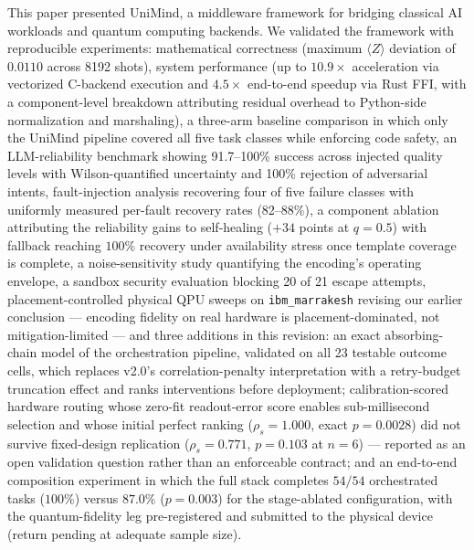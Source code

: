 ﻿\documentclass[12pt,a4paper]{article}
\begin{document}
This paper presented UniMind, a middleware framework for bridging classical AI workloads and quantum computing backends. We validated the framework with reproducible experiments: mathematical correctness (maximum $\langle Z \rangle$ deviation of $0.0110$ across 8192 shots), system performance (up to $10.9\times$ acceleration via vectorized C-backend execution and $4.5\times$ end-to-end speedup via Rust FFI, with a component-level breakdown attributing residual overhead to Python-side normalization and marshaling), a three-arm baseline comparison in which only the UniMind pipeline covered all five task classes while enforcing code safety, an LLM-reliability benchmark showing 91.7--100\% success across injected quality levels with Wilson-quantified uncertainty and 100\% rejection of adversarial intents, fault-injection analysis recovering four of five failure classes with uniformly measured per-fault recovery rates (82--88\%), a component ablation attributing the reliability gains to self-healing ($+34$ points at $q{=}0.5$) with fallback reaching $100\%$ recovery under availability stress once template coverage is complete, a noise-sensitivity study quantifying the encoding's operating envelope, a sandbox security evaluation blocking 20 of 21 escape attempts, placement-controlled physical QPU sweeps on \texttt{ibm\_marrakesh} revising our earlier conclusion --- encoding fidelity on real hardware is placement-dominated, not mitigation-limited --- and three additions in this revision: an exact absorbing-chain model of the orchestration pipeline, validated on all 23 testable outcome cells, which replaces v2.0's correlation-penalty interpretation with a retry-budget truncation effect and ranks interventions before deployment; calibration-scored hardware routing whose zero-fit readout-error score enables sub-millisecond selection and whose initial perfect ranking ($\rho_s = 1.000$, exact $p = 0.0028$) did not survive fixed-design replication ($\rho_s = 0.771$, $p = 0.103$ at $n{=}6$) --- reported as an open validation question rather than an enforceable contract; and an end-to-end composition experiment in which the full stack completes $54/54$ orchestrated tasks ($100\%$) versus $87.0\%$ ($p = 0.003$) for the stage-ablated configuration, with the quantum-fidelity leg pre-registered and submitted to the physical device (return pending at adequate sample size).
\end{document}

